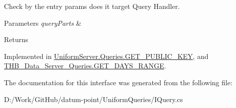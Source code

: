 Check by the entry params does it target Query Handler. 


\begin{DoxyParams}{Parameters}
{\em query\+Parts} & \\
\hline
\end{DoxyParams}
\begin{DoxyReturn}{Returns}

\end{DoxyReturn}


Implemented in \mbox{\hyperlink{class_uniform_server_1_1_queries_1_1_g_e_t___p_u_b_l_i_c___k_e_y_ae27d462fe9ccbbf22ac03c9ead9cbe8f}{Uniform\+Server.\+Queries.\+G\+E\+T\+\_\+\+P\+U\+B\+L\+I\+C\+\_\+\+K\+EY}}, and \mbox{\hyperlink{class_t_h_b___data___server___queries_1_1_g_e_t___d_a_y_s___r_a_n_g_e_a1f27cee6dbc3ba3fdfad0590a75d239b}{T\+H\+B\+\_\+\+Data\+\_\+\+Server\+\_\+\+Queries.\+G\+E\+T\+\_\+\+D\+A\+Y\+S\+\_\+\+R\+A\+N\+GE}}.



The documentation for this interface was generated from the following file\+:\begin{DoxyCompactItemize}
\item 
D\+:/\+Work/\+Git\+Hub/datum-\/point/\+Uniform\+Queries/I\+Query.\+cs\end{DoxyCompactItemize}
